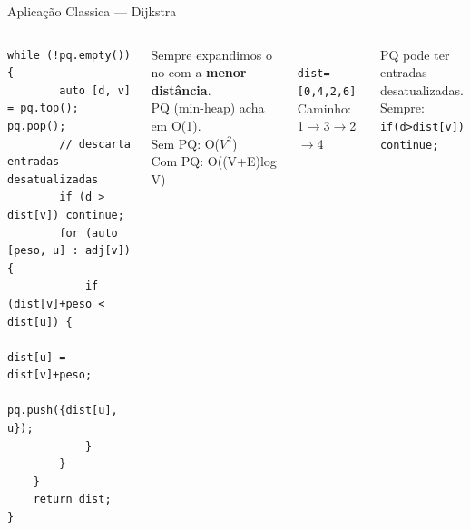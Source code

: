 \documentclass[aspectratio=169,10pt]{beamer}
\begin{document}
\begin{frame}[fragile,shrink=5]{Aplicação Classica --- Dijkstra}
\begin{columns}[t]
\begin{tcolorbox}[caixaCodigo]
\begin{lstlisting}[style=cppsmall]
    while (!pq.empty()) {
        auto [d, v] = pq.top(); pq.pop();
        // descarta entradas desatualizadas
        if (d > dist[v]) continue;
        for (auto [peso, u] : adj[v]) {
            if (dist[v]+peso < dist[u]) {
                dist[u] = dist[v]+peso;
                pq.push({dist[u], u});
            }
        }
    }
    return dist;
}
        \end{lstlisting}
      \end{tcolorbox}
      \begin{tcolorbox}[caixaAzul,title={Por que PQ em Dijkstra?}]
        \footnotesize
        Sempre expandimos o no com
        a \textbf{menor distância}.\\[3pt]
        PQ (min-heap) acha em O(1).\\[3pt]
        Sem PQ: O($V^2$)\\
        Com PQ: O((V+E)log V)
      \end{tcolorbox}
      \vspace{0.08cm}
      \begin{tcolorbox}[caixaVerde,title={Grafo de exemplo}]
        \centering\footnotesize
        \\[2pt]
        \texttt{dist=[0,4,2,6]}\\
        Caminho: 1$\to$3$\to$2$\to$4
      \end{tcolorbox}
      \vspace{0.08cm}
      \begin{tcolorbox}[caixaVermelho,title={Cuidado}]
        \footnotesize
        PQ pode ter entradas\\
        desatualizadas. Sempre:\\
        \texttt{if(d>dist[v]) continue;}
      \end{tcolorbox}
  \end{columns}
\end{frame}
\end{document}
